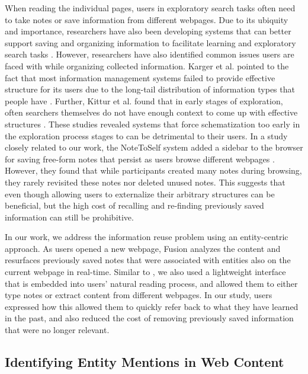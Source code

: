 When reading the individual pages, users in exploratory search tasks often need to take notes or save information from different webpages. Due to its ubiquity and importance, researchers have also been developing systems that can better support saving and organizing information to facilitate learning and exploratory search tasks \cite{schilit1998beyond, tashman2011liquidtext,hinckley2012informal,kittur2013costs,notetoself,chang2016supporting}. 
However, researchers have also identified common issues users are faced with while organizing collected information. Karger et al. pointed to the fact that most information management systems failed to provide effective structure for its users due to the long-tail distribution of information types that people have \cite{whatwentwrong}. Further, Kittur et al. found that in early stages of exploration, often searchers themselves do not have enough context to come up with effective structures \cite{kittur2013costs}. These studies revealed systems that force schematization too early in the exploration process stages to can be detrimental to their users. In a study closely related to our work, the NoteToSelf system added a sidebar to the browser for saving free-form notes that persist as users browse different webpages \cite{notetoself}. However, they found that while participants created many notes during browsing, they rarely revisited these notes nor deleted unused notes. This suggests that even though allowing users to externalize their arbitrary structures can be beneficial, but the high cost of recalling and re-finding previously saved information can still be prohibitive.

In our work, we address the information reuse problem using an entity-centric approach. As users opened a new webpage, Fusion analyzes the content and resurfaces previously saved notes that were associated with entities also on the current webpage in real-time. Similar to \cite{notetoself}, we also used a lightweight interface that is embedded into users' natural reading process, and allowed them to either type notes or extract content from different webpages. In our study, users expressed how this allowed them to quickly refer back to what they have learned in the past, and also reduced the cost of removing previously saved information that were no longer relevant. 

\subsection{Identifying Entity Mentions in Web Content}

